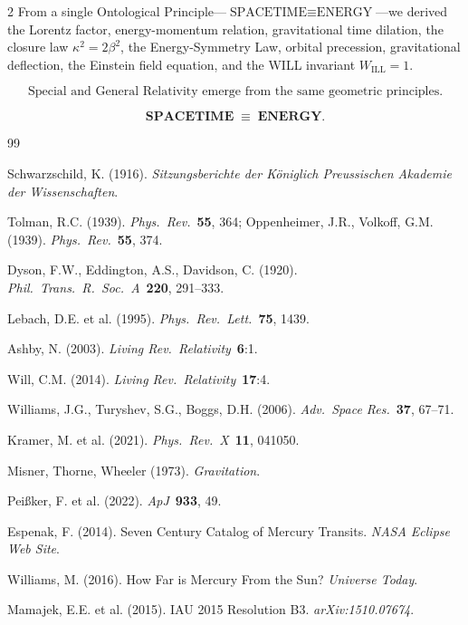 \documentclass[10pt, a4paper]{article}
\begin{document}
\begin{multicols}{2}
From a single Ontological Principle---$\text{SPACETIME} \equiv \text{ENERGY}$---we derived the Lorentz factor, energy-momentum relation, gravitational time dilation, the closure law $\kappa^2=2\beta^2$, the Energy-Symmetry Law, orbital precession, gravitational deflection, the Einstein field equation, and the WILL invariant $W_{\text{ILL}}=1$.

\[
\boxed{\text{Special and General Relativity emerge from the same geometric principles.}}
\]

\begin{tcolorbox}[colback=gray!5, colframe=black!80!black, title=Final Summary]
\[
\textbf{SPACETIME} \;\equiv\; \textbf{ENERGY}.
\]
\end{tcolorbox}



\begin{thebibliography}{99}

 Schwarzschild, K. (1916). \textit{Sitzungsberichte der K\"oniglich Preussischen Akademie der Wissenschaften}.

 Tolman, R.C. (1939). \textit{Phys.\ Rev.}\ \textbf{55}, 364; Oppenheimer, J.R., Volkoff, G.M. (1939). \textit{Phys.\ Rev.}\ \textbf{55}, 374.

 Dyson, F.W., Eddington, A.S., Davidson, C. (1920). \textit{Phil.\ Trans.\ R.\ Soc.\ A}\ \textbf{220}, 291--333.

 Lebach, D.E. et al. (1995). \textit{Phys.\ Rev.\ Lett.}\ \textbf{75}, 1439.

 Ashby, N. (2003). \textit{Living Rev.\ Relativity}\ \textbf{6}:1.

 Will, C.M. (2014). \textit{Living Rev.\ Relativity}\ \textbf{17}:4.

 Williams, J.G., Turyshev, S.G., Boggs, D.H. (2006). \textit{Adv.\ Space Res.}\ \textbf{37}, 67--71.

 Kramer, M. et al. (2021). \textit{Phys.\ Rev.\ X}\ \textbf{11}, 041050.

 Misner, Thorne, Wheeler (1973). \textit{Gravitation}.

 Pei{\ss}ker, F. et al. (2022). \textit{ApJ}\ \textbf{933}, 49.

 Espenak, F. (2014). Seven Century Catalog of Mercury Transits. \textit{NASA Eclipse Web Site}.

 Williams, M. (2016). How Far is Mercury From the Sun? \textit{Universe Today}.

 Mamajek, E.E. et al. (2015). IAU 2015 Resolution B3. \textit{arXiv:1510.07674}.

\end{thebibliography}

\end{multicols}
\end{document}
